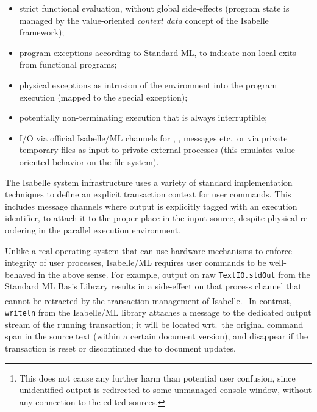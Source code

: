 \begin{isabellebody}
\begin{isamarkuptext}
  \begin{itemize}

  \item strict functional evaluation, without global side-effects
  (program state is managed by the value-oriented \emph{context data}
  concept of the Isabelle framework);

  \item program exceptions according to Standard ML, to indicate
  non-local exits from functional programs;

  \item physical exceptions as intrusion of the environment into the
  program execution (mapped to the special 
  exception);

  \item potentially non-terminating execution that is always
  interruptible;

  \item I/O via official Isabelle/ML channels for ,
  ,  messages etc.\ or via private
  temporary files as input to private external processes (this
  emulates value-oriented behavior on the file-system).

  \end{itemize}

  The Isabelle system infrastructure uses a variety of standard
  implementation techniques to define an explicit transaction context
  for user commands.  This includes message channels where output is
  explicitly tagged with an execution identifier, to attach it to the
  proper place in the input source, despite physical re-ordering in
  the parallel execution environment.

  Unlike a real operating system that can use hardware mechanisms to
  enforce integrity of user processes, Isabelle/ML requires user
  commands to be well-behaved in the above sense.  For example, output
  on raw \verb|TextIO.stdOut| from the Standard ML Basis Library
  results in a side-effect on that process channel that cannot be
  retracted by the transaction management of Isabelle.\footnote{This
  does not cause any further harm than potential user confusion, since
  unidentified output is redirected to some unmanaged console window,
  without any connection to the edited sources.}  In contrast, \verb|writeln| from the Isabelle/ML library attaches a message to the
  dedicated output stream of the running transaction; it will be
  located wrt.\ the original command span in the source text (within a
  certain document version), and disappear if the transaction is reset
  or discontinued due to document updates.


\end{isamarkuptext}
\end{isabellebody}

